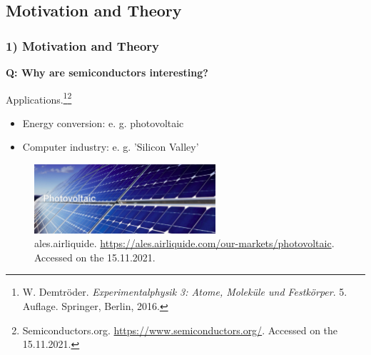 \subsection{Motivation and Theory}

\begin{frame}
	\frametitle{1) Motivation and Theory}
	\textbf{Q: Why are semiconductors interesting?}
	
	Applications.\footnote{\tiny{W. Demtröder. \textit{Experimentalphysik 3: Atome, Moleküle und Festkörper}. 5. Auflage. Springer, Berlin, 2016.}}\footnote{\tiny{Semiconductors.org. \url{https://www.semiconductors.org/}. Accessed on the 15.11.2021.}}
	\begin{itemize}
	    \item Energy conversion: e. g. photovoltaic
	    \item Computer industry: e. g. 'Silicon Valley'
	\end{itemize}
	\begin{figure}[H]
  		\includegraphics[width=0.6\textwidth]{images/chapter1/1_photovoltaic.png} 
  		\caption*{ales.airliquide. \url{https://ales.airliquide.com/our-markets/photovoltaic}. Accessed on the 15.11.2021.}
	\end{figure}
\end{frame}


